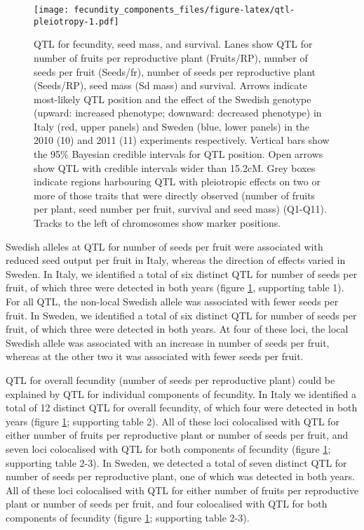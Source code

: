 \documentclass[]{article}
\begin{document}
\begin{figure}
\centering
\texttt{[image: fecundity\_components\_files/figure-latex/qtl-pleiotropy-1.pdf]}
\caption{\label{fig:qtl-pleiotropy}QTL for fecundity, seed mass, and survival. Lanes show QTL for number of fruits per reproductive plant (Fruits/RP), number of seeds per fruit (Seeds/fr), number of seeds per reproductive plant (Seeds/RP), seed mass (Sd mass) and survival. Arrows indicate most-likely QTL position and the effect of the Swedish genotype (upward: increased phenotype; downward: decreased phenotype) in Italy (red, upper panels) and Sweden (blue, lower panels) in the 2010 (10) and 2011 (11) experiments respectively. Vertical bars show the 95\% Bayesian credible intervals for QTL position. Open arrows show QTL with credible intervals wider than 15.2cM. Grey boxes indicate regions harbouring QTL with pleiotropic effects on two or more of those traits that were directly observed (number of fruits per plant, seed number per fruit, survival and seed mass) (Q1-Q11). Tracks to the left of chromosomes show marker positions.}
\end{figure}

Swedish alleles at QTL for number of seeds per fruit were associated with reduced seed output per fruit in Italy, whereas the direction of effects varied in Sweden.
In Italy, we identified a total of six distinct QTL for number of seeds per fruit, of which three were detected in both years (figure \ref{fig:qtl-pleiotropy}, supporting table 1).
For all QTL, the non-local Swedish allele was associated with fewer seeds per fruit.
In Sweden, we identified a total of six distinct QTL for number of seeds per fruit, of which three were detected in both years.
At four of these loci, the local Swedish allele was associated with an increase in number of seeds per fruit, whereas at the other two it was associated with fewer seeds per fruit.

QTL for overall fecundity (number of seeds per reproductive plant) could be explained by QTL for individual components of fecundity.
In Italy we identified a total of 12 distinct QTL for overall fecundity, of which four were detected in both years (figure \ref{fig:qtl-pleiotropy}; supporting table 2).
All of these loci colocalised with QTL for either number of fruits per reproductive plant or number of seeds per fruit, and seven loci colocalised with QTL for both components of fecundity (figure \ref{fig:qtl-pleiotropy}; supporting table 2-3).
In Sweden, we detected a total of seven distinct QTL for number of seeds per reproductive plant, one of which was detected in both years.
All of these loci colocalised with QTL for either number of fruits per reproductive plant or number of seeds per fruit, and four colocalised with QTL for both components of fecundity (figure \ref{fig:qtl-pleiotropy}; supporting table 2-3).
\end{document}
